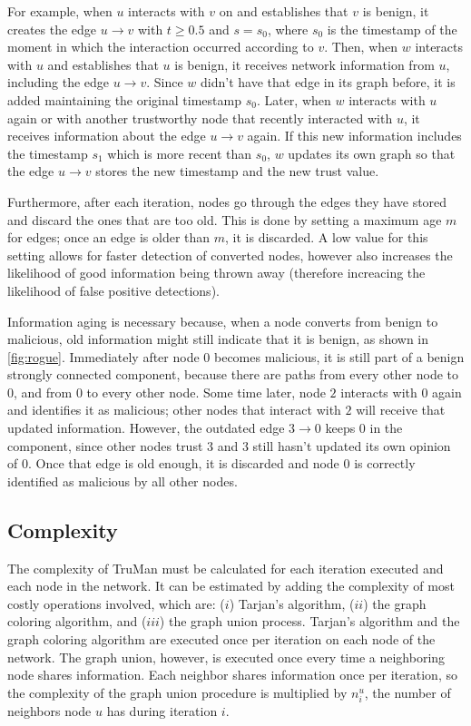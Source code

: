 For example, when $u$ interacts with $v$ on and establishes that $v$ is benign, it creates the edge $u \rightarrow v$ with $t \geq 0.5$ and $s = s_0$, where $s_0$ is the timestamp of the moment in which the interaction occurred according to $v$.
Then, when $w$ interacts with $u$ and establishes that $u$ is benign, it receives network information from $u$, including the edge $u\rightarrow v$.
Since $w$ didn't have that edge in its graph before, it is added maintaining the original timestamp $s_0$.
Later, when $w$ interacts with $u$ again or with another trustworthy node that recently interacted with $u$, it receives information about the edge $u\rightarrow v$ again.
If this new information includes the timestamp $s_1$ which is more recent than $s_0$, $w$ updates its own graph so that the edge $u\rightarrow v$ stores the new timestamp and the new trust value.

Furthermore, after each iteration, nodes go through the edges they have stored and discard the ones that are too old.
This is done by setting a maximum age $m$ for edges; once an edge is older than $m$, it is discarded.
A low value for this setting allows for faster detection of converted nodes, however  also increases the likelihood of good information being thrown away (therefore increacing the likelihood of false positive detections).

Information aging is necessary because, when a node converts from benign to malicious, old information might still indicate that it is benign, as shown in \autoref{fig:rogue}.
Immediately after node $0$ becomes malicious, it is still part of a benign strongly connected component, because there are paths from every other node to $0$, and from $0$ to every other node.
Some time later, node $2$ interacts with $0$ again and identifies it as malicious; other nodes that interact with $2$ will receive that updated information.
However, the outdated edge $3\rightarrow 0$ keeps $0$ in the component, since other nodes trust $3$ and $3$ still hasn't updated its own opinion of $0$.
Once that edge is old enough, it is discarded and node $0$ is correctly identified as malicious by all other nodes.

\subsection{Complexity}
The complexity of TruMan must be calculated for each iteration executed and each node in the network.
It can be estimated by adding the complexity of most costly operations involved, which are: ($i$) Tarjan's algorithm, ($ii$) the graph coloring algorithm, and ($iii$) the graph union process.
Tarjan's algorithm and the graph coloring algorithm are executed once per iteration on each node of the network.
The graph union, however, is executed once every time a neighboring node shares information.
Each neighbor shares information once per iteration, so the complexity of the graph union procedure is multiplied by $n^u_i$, the number of neighbors node $u$ has during iteration $i$.


